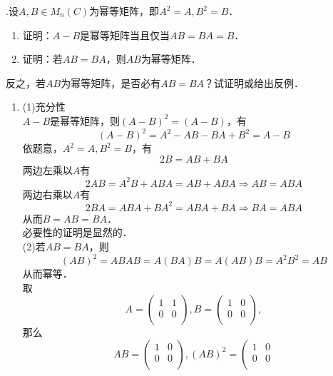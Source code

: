 \documentclass{article}
\begin{document}
\vspace{1ex}
{.}设$A,B\in M_n(C)$为幂等矩阵，即$A^2=A,B^2=B$．
\begin{enumerate}[\qquad (1)]
    \item 证明：$A-B$是幂等矩阵当且仅当$AB=BA=B$．
    \item 证明：若$AB=BA$，则$AB$为幂等矩阵．
\end{enumerate}
\qquad 反之，若$AB$为幂等矩阵，是否必有$AB=BA$？试证明或给出反例．

\begin{enumerate}[\qquad 证明：]
    \item (1)充分性
          \\ $A-B$是幂等矩阵，则$(A-B)^2=(A-B)$，有
          $$(A-B)^2=A^2-AB-BA+B^2=A-B$$
          依题意，$A^2=A,B^2=B$，有
          $$2B=AB+BA$$
          两边左乘以$A$有
          $$2AB=A^2B+ABA=AB+ABA\Rightarrow AB=ABA$$
          两边右乘以$A$有
          $$2BA=ABA+BA^2=ABA+BA\Rightarrow BA=ABA$$
          从而$B=AB=BA$．
          \\ 必要性的证明是显然的．
          \\ (2)若$AB=BA$，则
          $$(AB)^2=ABAB=A(BA)B=A(AB)B=A^2B^2=AB$$
          从而幂等．
          \\ 取
          $$
              A=\left(
              \begin{matrix}
                      1 & 1 \\
                      0 & 0 \\
                  \end{matrix}
              \right),
              B=\left(
              \begin{matrix}
                      1 & 0 \\
                      0 & 0 \\
                  \end{matrix}
              \right),
          $$
          那么
          $$
              AB=\left(
              \begin{matrix}
                      1 & 0 \\
                      0 & 0 \\
                  \end{matrix}
              \right),
              (AB)^2={\left(
              \begin{matrix}
                      1 & 0 \\
                      0 & 0 \\
                  \end{matrix}
}$$
\end{enumerate}
\end{document}
